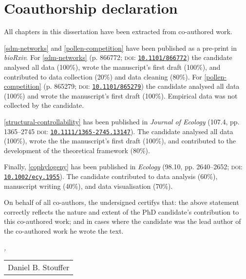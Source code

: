 
{}
\chapter*{Coauthorship declaration}
\thispagestyle{empty}

\begin{refsection}

All chapters in this dissertation have been extracted from co-authored work.

\autoref{sdm-networks} and \autoref{pollen-competition} have been published as a pre-print in \emph{bioRxiv}.
For \autoref{sdm-networks} (p. 866772; \textsc{doi}: \href{https://doi.org/10.1101/866772}{\texttt{10.1101/866772}}) the candidate analysed all data (100\%), wrote the manuscript's first draft (100\%), and contributed to data collection (20\%) and data cleaning (80\%).
For \autoref{pollen-competition} (p. 865279; \textsc{doi}: \href{https://doi.org/10.1101/865279}{\texttt{10.1101/865279}}) the candidate analysed all data (100\%) and wrote the manuscript's first draft (100\%). Empirical data was not collected by the candidate.

\autoref{structural-controllability} has been published in \emph{Journal of Ecology} (107.4, pp. 1365--2745 \textsc{doi}: \href{https://doi.org/10.1111/1365-2745.13147}{\texttt{10.1111/1365-2745.13147}}). The candidate analysed all data (100\%), wrote the the manuscript's first draft (100\%), and contributed to the development of the theoretical framework (80\%).

Finally, \autoref{cophylogeny} has been published in \emph{Ecology} (98.10, pp. 2640--2652; \textsc{doi}: \href{https://doi.org/10.1002/ecy.1955}{\texttt{10.1002/ecy.1955}}). The candidate contributed to data analysis (60\%), manuscript writing (40\%), and data visualisation (70\%).

\end{refsection}

On behalf of all co-authors, the undersigned certifys that: the above statement correctly reflects the nature and extent of the PhD candidate's contribution to this co-authored work; and in cases where the candidate was the lead author of the co-authored work he wrote the text.

\bigskip

\noindent\textit{\myLocation, \myTime}

\smallskip

\begin{flushright}
    \begin{tabular}{m{5cm}}
        \\ \hline
        \centering Daniel B. Stouffer \\
    \end{tabular}
\end{flushright}
